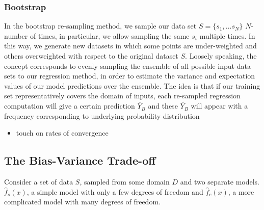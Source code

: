 \documentclass[reprint, english, nofootinbib]{revtex4-2}
\begin{document}
        \subsubsection{Bootstrap}
            \noindent
            In the bootstrap re-sampling method, we sample our data set $S = \{s_1, \dots s_N\}$ $N$-number of times, in particular, we allow sampling the same $s_i$ multiple times. In this way, we generate new datasets in which some points are under-weighted and others overweighted with respect to the original dataset $S$. Loosely speaking, the concept corresponds to evenly sampling the ensemble of all possible input data sets to our regression method, in order to estimate the variance and expectation values of our model predictions over the ensemble. The idea is that if our training set representatively covers the domain of inputs, each re-sampled regression computation will give a certain prediction $\tilde{Y_{B}}$ and these $\tilde{Y_{B}}$ will appear with a frequency corresponding to underlying probability distribution

            \begin{itemize}
                \item touch on rates of convergence
            \end{itemize}

    \subsection{The Bias-Variance Trade-off}
        \noindent
        Consider a set of data $S$, sampled from some domain $D$ and two separate models. $\hat f_s(x)$, a simple model with only a few degrees of freedom and $\hat f_c(x)$, a more complicated model with many degrees of freedom.
\end{document}

